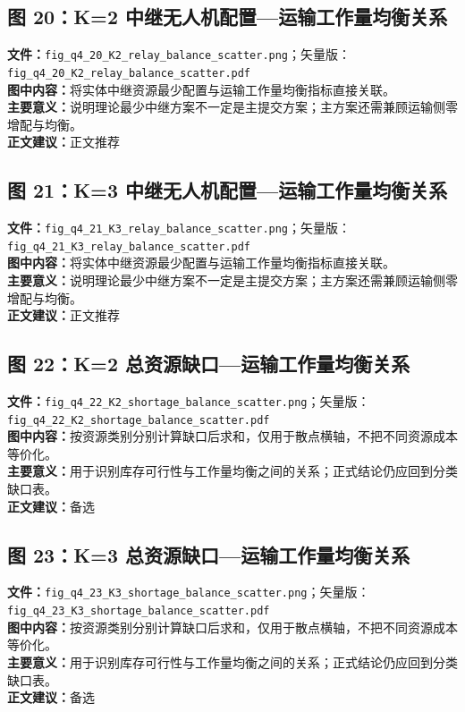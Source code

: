 \subsection*{图 20：K=2 中继无人机配置—运输工作量均衡关系}
\textbf{文件：}\texttt{fig\_q4\_20\_K2\_relay\_balance\_scatter.png}；矢量版：\texttt{fig\_q4\_20\_K2\_relay\_balance\_scatter.pdf}\\
\textbf{图中内容：}将实体中继资源最少配置与运输工作量均衡指标直接关联。\\
\textbf{主要意义：}说明理论最少中继方案不一定是主提交方案；主方案还需兼顾运输侧零增配与均衡。\\
\textbf{正文建议：}正文推荐

\subsection*{图 21：K=3 中继无人机配置—运输工作量均衡关系}
\textbf{文件：}\texttt{fig\_q4\_21\_K3\_relay\_balance\_scatter.png}；矢量版：\texttt{fig\_q4\_21\_K3\_relay\_balance\_scatter.pdf}\\
\textbf{图中内容：}将实体中继资源最少配置与运输工作量均衡指标直接关联。\\
\textbf{主要意义：}说明理论最少中继方案不一定是主提交方案；主方案还需兼顾运输侧零增配与均衡。\\
\textbf{正文建议：}正文推荐

\subsection*{图 22：K=2 总资源缺口—运输工作量均衡关系}
\textbf{文件：}\texttt{fig\_q4\_22\_K2\_shortage\_balance\_scatter.png}；矢量版：\texttt{fig\_q4\_22\_K2\_shortage\_balance\_scatter.pdf}\\
\textbf{图中内容：}按资源类别分别计算缺口后求和，仅用于散点横轴，不把不同资源成本等价化。\\
\textbf{主要意义：}用于识别库存可行性与工作量均衡之间的关系；正式结论仍应回到分类缺口表。\\
\textbf{正文建议：}备选

\subsection*{图 23：K=3 总资源缺口—运输工作量均衡关系}
\textbf{文件：}\texttt{fig\_q4\_23\_K3\_shortage\_balance\_scatter.png}；矢量版：\texttt{fig\_q4\_23\_K3\_shortage\_balance\_scatter.pdf}\\
\textbf{图中内容：}按资源类别分别计算缺口后求和，仅用于散点横轴，不把不同资源成本等价化。\\
\textbf{主要意义：}用于识别库存可行性与工作量均衡之间的关系；正式结论仍应回到分类缺口表。\\
\textbf{正文建议：}备选

